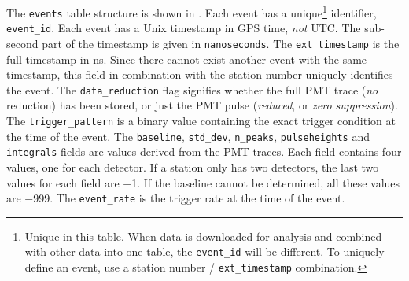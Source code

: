 The \verb|events| table structure is shown in .  Each
event has a unique\footnote{Unique in this table.  When data is downloaded for
analysis and combined with other data into one table, the \texttt{event\_id}
will be different.  To uniquely define an event, use a station number /
\texttt{ext\_timestamp} combination.} identifier, \verb|event_id|.  Each event
has a Unix timestamp in GPS time, \emph{not} UTC.  The sub-second part of the
timestamp is given in \verb|nanoseconds|.  The \verb|ext_timestamp| is the full
timestamp in \si{\nano\second}.  Since there cannot exist another event with the
same timestamp, this field in combination with the station number uniquely
identifies the event.  The \verb|data_reduction| flag signifies whether the full
PMT trace (\emph{no} reduction) has been stored, or just the PMT pulse
(\emph{reduced}, or \emph{zero suppression}).  The \verb|trigger_pattern| is a
binary value containing the exact trigger condition at the time of the event.
The \verb|baseline|, \verb|std_dev|, \verb|n_peaks|, \verb|pulseheights| and
\verb|integrals| fields are values derived from the PMT traces.  Each field
contains four values, one for each detector.  If a station only has two
detectors, the last two values for each field are \num{-1}.  If the baseline
cannot be determined, all these values are \num{-999}.  The \verb|event_rate| is
the trigger rate at the time of the event.
